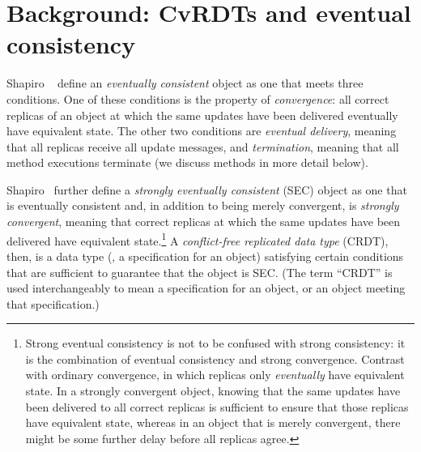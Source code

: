 \section{Background: CvRDTs and eventual consistency}\label{s:cvrdts}

Shapiro \etal~\cite{crdts,crdts-tr} define an \emph{eventually consistent}
object as one that
meets three conditions.  One of these conditions is
 the property of \emph{convergence}: all correct
replicas of an object at which the same updates have been delivered
eventually have equivalent state.  The other two conditions
are \emph{eventual delivery}, meaning that all replicas receive all
update messages, and \emph{termination}, meaning that all method
executions terminate (we discuss methods in more detail below).



Shapiro \etal~further define a \emph{strongly eventually consistent}
(SEC) object as one that is eventually consistent and, in addition to
being merely convergent, is \emph{strongly convergent}, meaning that
correct replicas at which the same updates have been delivered have
equivalent state.\footnote{
  Strong eventual consistency is not to be confused with strong
  consistency: it is the combination of eventual consistency and
  strong convergence.
  Contrast with ordinary convergence, in
  which replicas only \emph{eventually} have equivalent state.
  In a strongly convergent object, knowing that the same
  updates have been delivered to all correct replicas is sufficient to
  ensure that those replicas have equivalent state, whereas in an object
  that is merely convergent, there might be some further delay before
  all replicas agree.}
A \emph{conflict-free replicated data type} (CRDT), then,
is a data type (\ie, a specification for an object) satisfying certain
conditions that are sufficient to guarantee that the object is SEC.
(The term ``CRDT'' is used interchangeably to mean a specification for
an object, or an object meeting that specification.)

